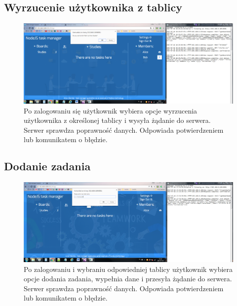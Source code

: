 \documentclass[12pt]{report}
\begin{document}
\subsection{Wyrzucenie użytkownika z tablicy}
\begin{figure}[!hb]
\centering
\includegraphics[width=\textwidth,height=\textheight,keepaspectratio]{92.png}
\captionsetup{labelformat=empty}
\caption[]{Po zalogowaniu się użytkownik wybiera opcje wyrzucenia użytkownika z określonej tablicy i wysyła żądanie do serwera. 
Serwer sprawdza poprawność danych. Odpowiada potwierdzeniem lub komunikatem o błędzie.}
\end{figure}

\subsection{Dodanie zadania}
\begin{figure}[!hb]
\centering
\includegraphics[width=\textwidth,height=\textheight,keepaspectratio]{A2.png}
\captionsetup{labelformat=empty}
\caption[]{Po zalogowaniu i wybraniu odpowiedniej tablicy użytkownik wybiera opcje dodania zadania, wypełnia dane i przesyła żądanie do serwera. 
Serwer sprawdza poprawność danych. Odpowiada potwierdzeniem lub komunikatem o błędzie.}
\end{figure}

\newpage 
\end{document}
